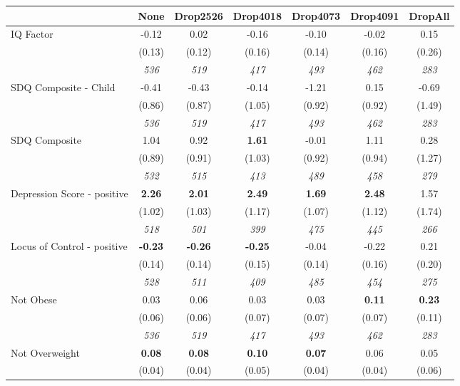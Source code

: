 \begin{tabular}{l c c c c c c}
\toprule
 & None & Drop2526 & Drop4018 & Drop4073 & Drop4091 & DropAll \\
\midrule
IQ Factor & -0.12 & 0.02 & -0.16 & -0.10 & -0.02 & 0.15 \\
& (0.13) & (0.12) & (0.16) & (0.14) & (0.16) & (0.26) \\
& \textit{ 536 } & \textit{ 519 } & \textit{ 417 } & \textit{ 493 } & \textit{ 462 } & \textit{ 283 } \\
SDQ Composite - Child & -0.41 & -0.43 & -0.14 & -1.21 & 0.15 & -0.69 \\
& (0.86) & (0.87) & (1.05) & (0.92) & (0.92) & (1.49) \\
& \textit{ 536 } & \textit{ 519 } & \textit{ 417 } & \textit{ 493 } & \textit{ 462 } & \textit{ 283 } \\
SDQ Composite & 1.04 & 0.92 & \textbf{ 1.61 } & -0.01 & 1.11 & 0.28 \\
& (0.89) & (0.91) & (1.03) & (0.92) & (0.94) & (1.27) \\
& \textit{ 532 } & \textit{ 515 } & \textit{ 413 } & \textit{ 489 } & \textit{ 458 } & \textit{ 279 } \\
Depression Score - positive & \textbf{ 2.26 } & \textbf{ 2.01 } & \textbf{ 2.49 } & \textbf{ 1.69 } & \textbf{ 2.48 } & 1.57 \\
& (1.02) & (1.03) & (1.17) & (1.07) & (1.12) & (1.74) \\
& \textit{ 518 } & \textit{ 501 } & \textit{ 399 } & \textit{ 475 } & \textit{ 445 } & \textit{ 266 } \\
Locus of Control - positive & \textbf{ -0.23 } & \textbf{ -0.26 } & \textbf{ -0.25 } & -0.04 & -0.22 & 0.21 \\
& (0.14) & (0.14) & (0.15) & (0.14) & (0.16) & (0.20) \\
& \textit{ 528 } & \textit{ 511 } & \textit{ 409 } & \textit{ 485 } & \textit{ 454 } & \textit{ 275 } \\
Not Obese & 0.03 & 0.06 & 0.03 & 0.03 & \textbf{ 0.11 } & \textbf{ 0.23 } \\
& (0.06) & (0.06) & (0.07) & (0.07) & (0.07) & (0.11) \\
& \textit{ 536 } & \textit{ 519 } & \textit{ 417 } & \textit{ 493 } & \textit{ 462 } & \textit{ 283 } \\
Not Overweight & \textbf{ 0.08 } & \textbf{ 0.08 } & \textbf{ 0.10 } & \textbf{ 0.07 } & 0.06 & 0.05 \\
& (0.04) & (0.04) & (0.05) & (0.04) & (0.04) & (0.06) \\

\end{tabular}
